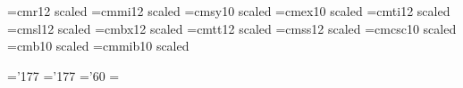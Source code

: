
\def\getxiiipt{%
     \font\xiiiptrm=cmr12  scaled\magstephalf
     \font\xiiiptmit=cmmi12 scaled\magstephalf
     \font\xiiiptsy=cmsy9  scaled\magstep2
     \font\xiiiptit=cmti12 scaled\magstephalf
     \font\xiiiptsl=cmsl12 scaled\magstephalf
     \font\xiiiptbf=cmbx12 scaled\magstephalf
     \font\xiiipttt=cmtt12 scaled\magstephalf
     \font\xiiiptss=cmss12 scaled\magstephalf
     \skewchar\xiiiptmit='177 \skewchar\xiiiptsy='60
     \fontdimen16 \xiiiptsy=\the\fontdimen17 \xiiiptsy}

\def\xiiipt{\ifmmode\err@badsizechange\else
     \@mathfontinit
     \textfont0=\xiiiptrm  \scriptfont0=\xptrm  \scriptscriptfont0=\viiptrm
     \textfont1=\xiiiptmit \scriptfont1=\xptmit \scriptscriptfont1=\viiptmit
     \textfont2=\xiiiptsy  \scriptfont2=\xptsy  \scriptscriptfont2=\viiptsy
     \textfont3=\xivptex   \scriptfont3=\xptex  \scriptscriptfont3=\xptex
     \textfont\itfam=\xiiiptit
     \scriptfont\itfam=\xptit
     \scriptscriptfont\itfam=\viiptit
     \textfont\bffam=\xiiiptbf
     \scriptfont\bffam=\xptbf
     \scriptscriptfont\bffam=\viiptbf
     \@fontstyleinit
     \def\rm{\xiiiptrm\fam=\z@}%
     \def\it{\xiiiptit\fam=\itfam}%
     \def\sl{\xiiiptsl}%
     \def\bf{\xiiiptbf\fam=\bffam}%
     \def\tt{\xiiipttt}%
     \def\ss{\xiiiptss}%
     \def\oldstyle{\xiiiptmit\fam=\@ne}%
     \rm\fi}


\font\xivptrm=cmr12   scaled
\font\xivptmit=cmmi12  scaled
\font\xivptsy=cmsy10  scaled
\font\xivptex=cmex10  scaled
\font\xivptit=cmti12  scaled
\font\xivptsl=cmsl12  scaled
\font\xivptbf=cmbx12  scaled
\font\xivpttt=cmtt12  scaled
\font\xivptss=cmss12  scaled
\font\xivptsc=cmcsc10 scaled
\font\xivptbfs=cmb10  scaled
\font\xivptbmit=cmmib10 scaled

\skewchar\xivptmit='177 \skewchar\xivptbmit='177 \skewchar\xivptsy='60
 \xivptsy=\the{} \xivptsy

